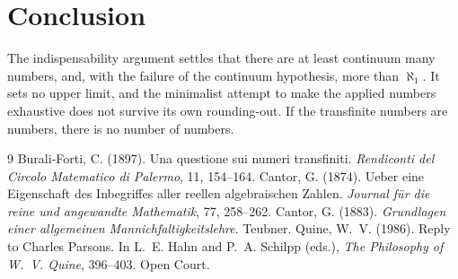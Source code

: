 \documentclass{situationist-preprint}
\begin{document}
\section{Conclusion}

The indispensability argument settles that there are at least continuum many numbers, and, with the failure of the continuum hypothesis, more than $\aleph_1$. It sets no upper limit, and the minimalist attempt to make the applied numbers exhaustive does not survive its own rounding-out. If the transfinite numbers are numbers, there is no number of numbers.

\begin{thebibliography}{9}\small
{} Burali-Forti, C. (1897). Una questione sui numeri transfiniti. \emph{Rendiconti del Circolo Matematico di Palermo}, 11, 154--164.
 Cantor, G. (1874). Ueber eine Eigenschaft des Inbegriffes aller reellen algebraischen Zahlen. \emph{Journal f\"ur die reine und angewandte Mathematik}, 77, 258--262.
 Cantor, G. (1883). \emph{Grundlagen einer allgemeinen Mannichfaltigkeitslehre}. Teubner.
 Quine, W.~V. (1986). Reply to Charles Parsons. In L.~E. Hahn and P.~A. Schilpp (eds.), \emph{The Philosophy of W.~V. Quine}, 396--403. Open Court.
\end{thebibliography}
\end{document}
